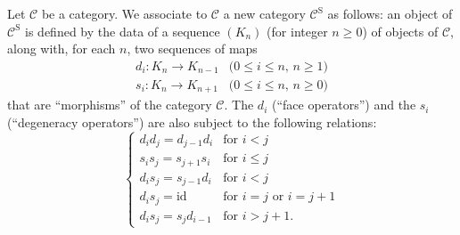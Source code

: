 \documentclass{article}
\theoremstyle{plain}
\theoremstyle{definition}
\newcommand{\cat}{\mathcal}
\newcommand{\id}{\mathrm{id}}
\renewcommand{\SS}{\mathrm{S}}
\renewcommand{\geq}{\geqslant}
\renewcommand{\leq}{\leqslant}
\begin{document}
Let $\cat{C}$ be a category.
We associate to $\cat{C}$ a new category $\cat{C}^\SS$ as follows: an object of $\cat{C}^\SS$ is defined by the data of a sequence $(K_n)$ (for integer $n\geq0$) of objects of $\cat{C}$, along with, for each $n$, two sequences of maps
\[
  \begin{array}{ll}
    d_i\colon K_n \to K_{n-1}
    & \mbox{($0\leq i\leq n$, $n\geq1$)}
  \\s_i\colon K_n \to K_{n+1}
    & \mbox{($0\leq i\leq n$, $n\geq0$)}
  \end{array}
\]
that are ``morphisms'' of the category $\cat{C}$.
The $d_i$ (``face operators'') and the $s_i$ (``degeneracy operators'') are also subject to the following relations:
\[
\label{equation1}
  \begin{cases}
    d_i d_j = d_{j-1} d_i &\mbox{for $i<j$}
  \\s_i s_j = s_{j+1} s_i &\mbox{for $i\leq j$}
  \\d_i s_j = s_{j-1} d_i &\mbox{for $i<j$}
  \\d_i s_j = \id &\mbox{for $i=j$ or $i=j+1$}
  \\d_i s_j = s_j d_{i-1} &\mbox{for $i>j+1$.}
  \end{cases}
\tag{1}
\]
\end{document}
